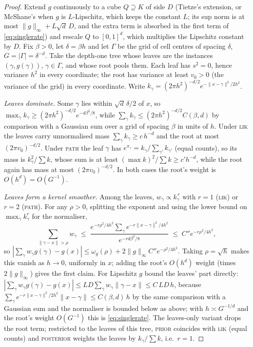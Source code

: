 \documentclass[11pt]{article}
\theoremstyle{definition}
\theoremstyle{remark}
\begin{document}
\begin{proof}
Extend $g$ continuously to a cube $Q\supseteq K$ of side $D$ (Tietze's extension, or
McShane's when $g$ is $L$-Lipschitz, which keeps the constant $L$; its sup norm is at most
$\|g\|_\infty+L\sqrt d\,D$, and the extra term is absorbed in the first term of
\eqref{eq:singlerate}) and rescale $Q$ to $[0,1]^d$, which multiplies the Lipschitz
constant by $D$.
Fix $\beta>0$, let $\delta=\beta h$ and let $\Gamma$ be the grid of cell centres of
spacing $\delta$, $G=|\Gamma|=\delta^{-d}$.  Take the depth-one tree whose leaves are
the instances $(\gamma,g(\gamma))$, $\gamma\in\Gamma$, and whose root pools them.  Each
leaf has $s^2=0$, hence variance $h^2$ in every coordinate; the root has variance at
least $v_0>0$ (the variance of the grid) in every coordinate.  Write
$k_\gamma=(2\pi h^2)^{-d/2}e^{-\|x-\gamma\|^2/2h^2}$.

\emph{Leaves dominate.}  Some $\gamma$ lies within $\sqrt d\,\delta/2$ of $x$, so
$\max_\gamma k_\gamma\ge(2\pi h^2)^{-d/2}e^{-d\beta^2/8}$, while
$\sum_\gamma k_\gamma\le(2\pi h^2)^{-d/2}C(\beta,d)$ by comparison with a Gaussian sum
over a grid of spacing $\beta$ in units of $h$.  Under \textsc{lik} the leaves carry
unnormalised mass $\sum_\gamma k_\gamma\ge c\,h^{-d}$ and the root at most
$(2\pi v_0)^{-d/2}$.  Under \textsc{path} the leaf $\gamma$ has
$e^{\pi_\gamma}=k_\gamma/\sum_{\gamma'}k_{\gamma'}$ (equal counts), so its mass is
$k_\gamma^2/\sum k$, whose sum is at least $(\max k)^2/\sum k\ge c'h^{-d}$, while the root
again has mass at most $(2\pi v_0)^{-d/2}$.  In both cases the root's weight is
$O(h^d)=O(G^{-1})$.

\emph{Leaves form a kernel smoother.}  Among the leaves, $w_\gamma\propto k_\gamma^{\,r}$
with $r=1$ (\textsc{lik}) or $r=2$ (\textsc{path}).  For any $\rho>0$, splitting the
exponent and using the lower bound on $\max_\gamma k_\gamma^r$ for the normaliser,
\[
\sum_{\|\gamma-x\|>\rho}w_\gamma\;\le\;
\frac{e^{-r\rho^2/4h^2}\sum_\gamma e^{-r\|x-\gamma\|^2/4h^2}}{e^{-rd\beta^2/8}}
\;\le\;C''e^{-r\rho^2/4h^2},
\]
so $|\sum_\gamma w_\gamma g(\gamma)-g(x)|\le\omega_g(\rho)+2\|g\|_\infty C''e^{-\rho^2/4h^2}$.
Taking $\rho=\sqrt h$ makes this vanish as $h\to0$, uniformly in $x$; adding the root's
$O(h^d)$ weight (times $2\|g\|_\infty$) gives the first claim.  For Lipschitz $g$ bound
the leaves' part directly: $|\sum_\gamma w_\gamma g(\gamma)-g(x)|\le
LD\sum_\gamma w_\gamma\|\gamma-x\|\le C\,LD\,h$, because
$\sum_\gamma e^{-r\|x-\gamma\|^2/2h^2}\|x-\gamma\|\le C(\beta,d)\,h$ by the same comparison
with a Gaussian sum and the normaliser is bounded below as above; with $h\asymp G^{-1/d}$
and the root's weight $O(G^{-1})$ this is \eqref{eq:singlerate}.  The leaves-only
variant drops the root term; restricted to the leaves of this tree, \textsc{prior}
coincides with \textsc{lik} (equal counts) and \textsc{posterior} weights the leaves by
$k_\gamma/\sum k$, i.e.\ $r=1$.
\end{proof}
\end{document}
